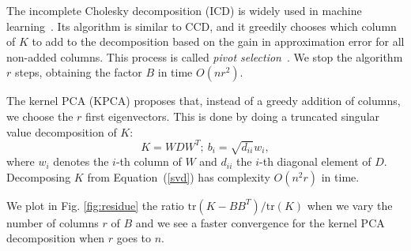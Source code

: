 The incomplete Cholesky decomposition (ICD) is widely used in machine learning~\cite{BaJo02,BaJo05,FiSc01}. Its algorithm is similar to CCD, and it greedily chooses which column of $K$ to add to the decomposition based on the gain in approximation error for all non-added columns. This process is called \emph{pivot selection}~\cite{BaJo05}. We stop the algorithm $r$ steps, obtaining the factor $B$ in time $O(nr^2)$.

The kernel PCA (KPCA) proposes that, instead of a greedy addition of columns, we choose the $r$ first eigenvectors. This is done by doing a truncated singular value decomposition of $K$:
\begin{equation}
    K = WDW^T; \ b_i = \sqrt{d_{ii}}w_i, \label{svd}
\end{equation}
where $w_i$ denotes the $i$-th column of $W$ and $d_{ii}$ the $i$-th diagonal element of $D$. Decomposing $K$ from Equation~(\ref{svd}) has complexity $O(n^2r)$ in time.~\cite{golub2012matrix}

We plot in Fig. \ref{fig:residue} the ratio $\mathrm{tr}(K-BB^T)/\mathrm{tr}(K)$ when we vary the number of columns $r$ of $B$ and we see a faster convergence for the kernel PCA decomposition when $r$ goes to $n$.



